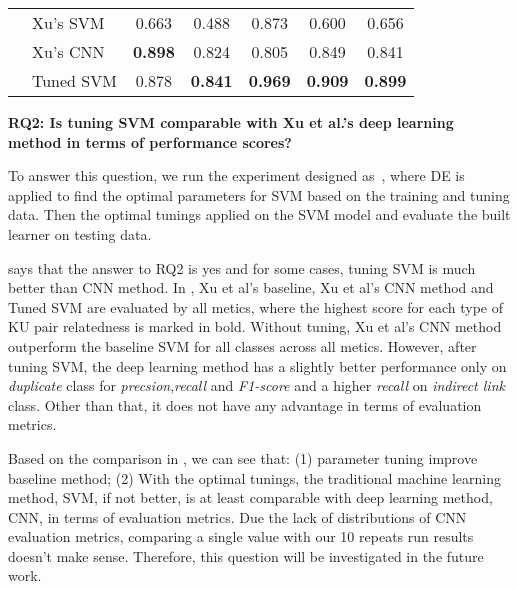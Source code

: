 \begin{table}[!htp]
{\begin{tabular} {@{}l l  c c  c c c@{}}
   & Xu's SVM& 0.663 &  0.488  & 0.873 &  0.600 &0.656 \\ 
   & Xu's CNN& \textbf{0.898} &  0.824  & 0.805 &  0.849 &0.841 \\
   & Tuned SVM& 0.878 & \textbf{ 0.841}  &\textbf{ 0.969} &  \textbf{0.909} &\textbf{0.899} \\\hline
 \end{tabular}}
\label{tab:RQ2}
\end{table}

\textbf{RQ2: Is tuning SVM comparable with Xu et al.'s deep learning method in terms of performance scores?}

To answer this question, we run the experiment designed as~, where DE is applied to 
find the optimal parameters for SVM based on the training and tuning data. Then the optimal tunings
applied on the SVM model and evaluate the built learner on testing data.

 says that the answer to RQ2 is yes and for some cases, tuning SVM is much better than
CNN method. In ,  Xu et al's baseline, Xu et al's CNN method and Tuned SVM are
evaluated by all metics, where the highest score for each type of KU pair
relatedness is marked in bold.  Without tuning, Xu et al's CNN method outperform
the baseline SVM for all classes across all metics. However, after tuning SVM, the deep learning
method has a slightly better performance only on {\it duplicate} class for {\it precsion},{\it recall} and {\it F1-score} and 
 a higher {\it recall} on {\it indirect link} class. Other than that, it does not have any advantage in terms of evaluation
 metrics.
 
 Based on the comparison in , we can see that: (1) parameter tuning improve baseline method;
 (2) With the optimal tunings, the traditional machine learning method, SVM, if not better, is at least comparable 
 with deep learning method, CNN, in terms of evaluation metrics.  
 Due the lack of distributions of CNN evaluation metrics, comparing a single value with our 10 repeats run results doesn't
 make sense. Therefore, this question will be investigated in the future work.
 
